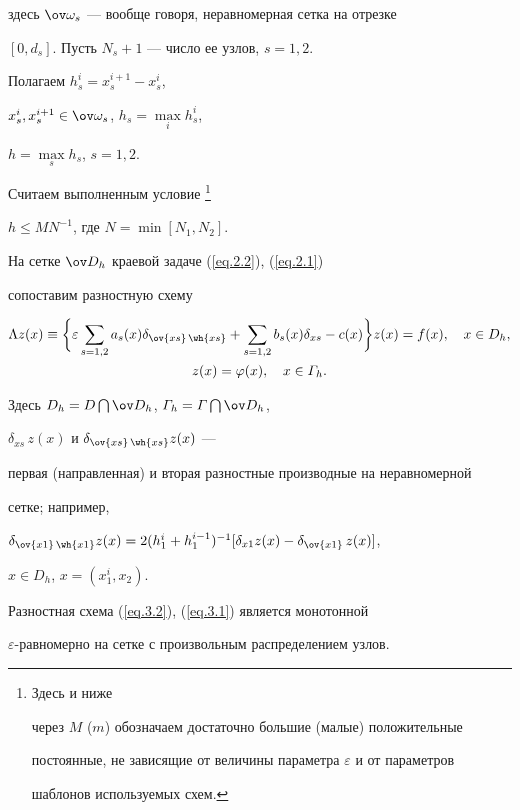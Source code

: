 здесь $\ov\omega_s$ --- вообще говоря, неравномерная сетка на отрезке


$[0,d_s]$. Пусть $N_s+1$ --- число ее узлов, $s=1, 2$.


Полагаем $h^i_s=x_s^{i+1}-x_s^i$,


$x_s^i,x_s^{i+1}\in \ov\omega_s$, $h_s=\max\limits_i h_s^i$,


$h=\max\limits_s h_s$, $s=1, 2$.


Считаем выполненным условие \footnote{Здесь и ниже


через $M$ ($m$) обозначаем достаточно большие (малые) положительные


постоянные, не зависящие от величины параметра $\varepsilon$ и от параметров


шаблонов используемых схем.}


$h\le M N^{-1}$, где $N=\min [N_1, N_2]$.


На сетке $\ov D_h$ краевой задаче (\ref{eq.2.2}), (\ref{eq.2.1})


сопоставим разностную схему \cite{2}


\begin{gather} \label{eq.3.2}


\Lambda z(x)\equiv \bigg\{\varepsilon\sum_{s=1,2}a_s(x)


\delta_{\ov{xs}\,\wh{xs}}+\sum_{s=1,2}b_s(x)\delta_{xs}-


c(x)\bigg\}z(x)=f(x), \quad x\in D_h, \\


z(x)=\varphi(x), \quad x\in \varGamma_h. \notag


\end{gather}


Здесь $D_h=D\bigcap \ov D_h$, $\varGamma_h=\varGamma\bigcap \ov D_h$, 


$\delta_{xs}\,z(x)$ и $\delta_{\ov{xs}\,\wh{xs}}z(x)$ ---


первая (направленная) и вторая разностные производные на неравномерной


сетке; например,


$\delta_{\ov{x1}\,\wh{x1}}z(x)=


2(h_1^i+h_1^{i-1})^{-1}[\delta_{x1}z(x)-\delta_{\ov{x1}}\,z(x)]$,


$x\in D_h$, $x=(x_1^i,x_2)$.





Разностная схема (\ref{eq.3.2}), (\ref{eq.3.1}) является монотонной \cite{2}


$\varepsilon$-равномерно на сетке с произвольным распределением узлов.





